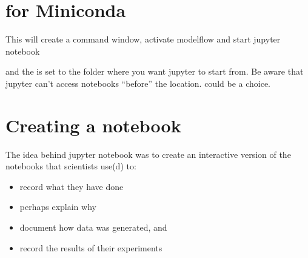 \documentclass[letterpaper,10pt,english]{jupyterBook}
\begin{document}
\section{for Miniconda}
\label{\detokenize{content/04_PythonEssentials/Intro_Jupyter_notebook:for-miniconda}}
\begin{sphinxVerbatim}[commandchars=\\\{\}]
\PYGZbs{}\PYGZbs{}  \PYGZbs{}\PYGZbs{}\PYGZbs{} \PYGZbs{}\PYGZbs{}\PYGZbs{} 
\end{sphinxVerbatim}

\sphinxAtStartPar
This will create a command window, activate modelflow and start jupyter notebook

\sphinxAtStartPar
and the   is set to the folder where you want jupyter to start from. 
Be aware that jupyter can’t access notebooks “before” the  location.  could be a choice.


\section{Creating a notebook}
\label{\detokenize{content/04_PythonEssentials/Intro_Jupyter_notebook:creating-a-notebook}}
\sphinxAtStartPar
The idea behind jupyter notebook was to create an interactive version of the notebooks that scientists use(d) to:
\begin{itemize}
\item {} 
\sphinxAtStartPar
record what they have done

\item {} 
\sphinxAtStartPar
perhaps explain why

\item {} 
\sphinxAtStartPar
document how data was generated, and

\item {} 
\sphinxAtStartPar
record the results of their experiments

\end{itemize}
\end{document}
